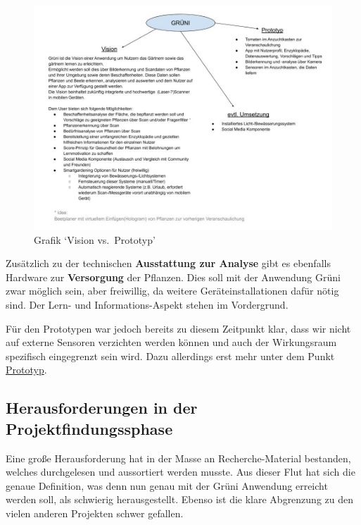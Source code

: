 \begin{figure}
\centering
\includegraphics{img/Projektthema.jpg}
\caption{Grafik `Vision vs.~Prototyp'}
\end{figure}

Zusätzlich zu der technischen \textbf{Ausstattung zur Analyse} gibt es
ebenfalls Hardware zur \textbf{Versorgung} der Pflanzen. Dies soll mit
der Anwendung Grüni zwar möglich sein, aber freiwillig, da weitere
Geräteinstallationen dafür nötig sind. Der Lern- und Informations-Aspekt
stehen im Vordergrund.

Für den Prototypen war jedoch bereits zu diesem Zeitpunkt klar, dass wir
nicht auf externe Sensoren verzichten werden können und auch der
Wirkungsraum spezifisch eingegrenzt sein wird. Dazu allerdings erst mehr
unter dem Punkt \protect\hyperlink{prototyp}{Prototyp}.

\hypertarget{herausforderungen-in-der-projektfindungssphase}{%
\subsection{Herausforderungen in der
Projektfindungssphase}\label{herausforderungen-in-der-projektfindungssphase}}

Eine große Herausforderung hat in der Masse an Recherche-Material
bestanden, welches durchgelesen und aussortiert werden musste. Aus
dieser Flut hat sich die genaue Definition, was denn nun genau mit der
Grüni Anwendung erreicht werden soll, als schwierig herausgestellt.
Ebenso ist die klare Abgrenzung zu den vielen anderen Projekten schwer
gefallen.
